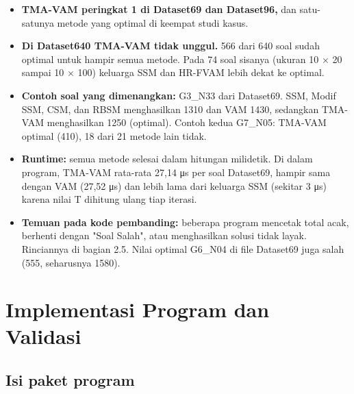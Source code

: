 \documentclass[10pt,a4paper]{article}
\begin{document}
\begin{itemize}
\item
  \textbf{TMA-VAM peringkat 1 di Dataset69 dan Dataset96,} dan
  satu-satunya metode yang optimal di keempat studi kasus.
\item
  \textbf{Di Dataset640 TMA-VAM tidak unggul.} 566 dari 640 soal sudah
  optimal untuk hampir semua metode. Pada 74 soal sisanya (ukuran 10 ×
  20 sampai 10 × 100) keluarga SSM dan HR-FVAM lebih dekat ke optimal.
\item
  \textbf{Contoh soal yang dimenangkan:} G3\_N33 dari Dataset69. SSM,
  Modif SSM, CSM, dan RBSM menghasilkan 1310 dan VAM 1430, sedangkan
  TMA-VAM menghasilkan 1250 (optimal). Contoh kedua G7\_N05: TMA-VAM
  optimal (410), 18 dari 21 metode lain tidak.
\item
  \textbf{Runtime:} semua metode selesai dalam hitungan milidetik. Di
  dalam program, TMA-VAM rata-rata 27,14 μs per soal Dataset69, hampir sama dengan VAM (27,52 μs) dan lebih lama dari keluarga SSM (sekitar 3 μs) karena nilai T dihitung ulang tiap iterasi.
\item
  \textbf{Temuan pada kode pembanding:} beberapa program mencetak total
  acak, berhenti dengan "Soal Salah", atau menghasilkan solusi tidak
  layak. Rinciannya di bagian 2.5. Nilai optimal G6\_N04 di file
  Dataset69 juga salah (555, seharusnya 1580).
\end{itemize}

\section{Implementasi Program dan Validasi}\label{program}

\subsection{Isi paket program}\label{isi-paket-program}
\end{document}
